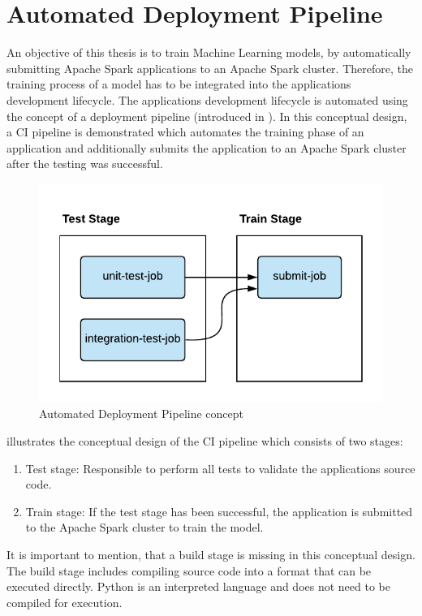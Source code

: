 \section{Automated Deployment Pipeline}
\label{sec:05_pipeline}
An objective of this thesis is to train Machine Learning models, by automatically submitting Apache Spark applications to an Apache Spark cluster. Therefore, the training process of a model has to be integrated into the applications development lifecycle.
%
The applications development lifecycle is automated using the concept of a deployment pipeline (introduced in ).
%
In this conceptual design, a CI pipeline is demonstrated which automates the training phase of an application and additionally submits the application to an Apache Spark cluster after the testing was successful.


\begin{figure}[h]
\centering
\includegraphics[scale=1]{images/05_conceptual_design/automated_deployment_pipeline/ci_cd_concept}
\caption{Automated Deployment Pipeline concept}
\label{fig:05_deployment_concept}
\end{figure}
 illustrates the conceptual design of the CI pipeline which consists of two stages:
\begin{enumerate}
\item Test stage: Responsible to perform all tests to validate the applications source code.
\item Train stage: If the test stage has been successful, the application is submitted to the Apache Spark cluster to train the model.
\end{enumerate}
It is important to mention, that a build stage is missing in this conceptual design. The build stage includes compiling source code into a format that can be executed directly.
Python is an interpreted language and does not need to be compiled for execution.


